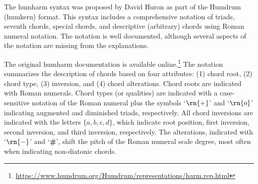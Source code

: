 

The \gls{humharm} syntax was proposed by David Huron as part
of the Humdrum (\gls{humkern}) format. This syntax includes
a comprehensive notation of triads, seventh chords, special
chords, and descriptive (arbitrary) chords using Roman
numeral notation. The notation is well documented, although
several aspects of the notation are missing from the
explanations.

The original \gls{humharm} documentation is available
online.\footnote{\href{https://www.humdrum.org/Humdrum/representations/harm.rep.html}{https://www.humdrum.org/Humdrum/representations/harm.rep.html}}
The notation summarizes the description of chords based on
four attributes: (1) chord root, (2) chord type, (3)
inversion, and (4) chord alterations. Chord roots are
indicated with Roman numerals. Chord types (or qualities)
are indicated with a case-sensitive notation of the Roman
numeral plus the symbols `$\rn{+}$' and `$\rn{o}$'
indicating augmented and diminished triads, respectively.
All chord inversions are indicated with the letters $\{a, b,
c, d\}$, which indicate root position, first inversion,
second inversion, and third inversion, respectively. The
alterations, indicated with `$\rn{-}$' and
`\textbf{\#}', shift the pitch of the Roman numeral
scale degree, most often when indicating non-diatonic
chords.
